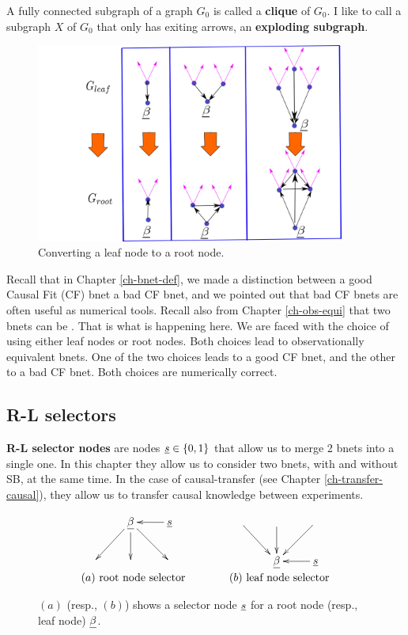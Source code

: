 A fully connected subgraph of 
a graph $G_0$ is called a 
{\bf clique} of $G_0$.
I like to call a subgraph $X$  of $G_0$ that only has exiting arrows, an 
{\bf exploding subgraph}.



\begin{figure}[h!]
\centering
\includegraphics[width=4in]
{sb-removal/sel-nd-reversal.png}
\caption{Converting 
a leaf node
to a root node.}
\label{fig-sel-nd-reversal}
\end{figure}

Recall that in Chapter \ref{ch-bnet-def},
we made a distinction
between a good Causal Fit (CF) bnet
a bad CF bnet, and
we pointed out
that bad CF bnets are
often useful as
numerical tools.
Recall also from Chapter
\ref{ch-obs-equi}
that two bnets can be
.
That is what is happening here.
We are faced with
the choice of
using
either
leaf nodes or root nodes.
Both
choices  lead to observationally
equivalent bnets.
One of the two choices
leads to a good
CF bnet,
and the other to a bad CF bnet.
Both choices are numerically
correct.

\subsection{R-L selectors}
{\bf R-L selector nodes} are  nodes
$\rvs\in \bool$ that allow us to merge 2 bnets into a single one. In this chapter they allow us 
to consider two bnets, with and without SB, at the same time.
In the case of causal-transfer (see Chapter \ref{ch-transfer-causal}), they
allow us
 to transfer causal knowledge
between experiments.


\begin{figure}[h!]
$$
\begin{array}{ccc}
\xymatrix{
&\rvbeta\ar[dl]\ar[d]\ar[dr]&\rvs\ar[l]
\\
&&
}
&\quad\quad&
\xymatrix{
\ar[dr]&\ar[d]&\ar[dl]
\\
&\rvbeta&\rvs\ar[l]
}
\\
(a)\text{ root node selector} 
&& (b)\text{ leaf node selector}
\end{array}
$$
\caption{$(a)$ (resp., $(b)$) shows a selector node $\rvs$ for a
root node (resp., leaf node) $\rvbeta$.}
\label{fig-rl-selectors}
\end{figure}

